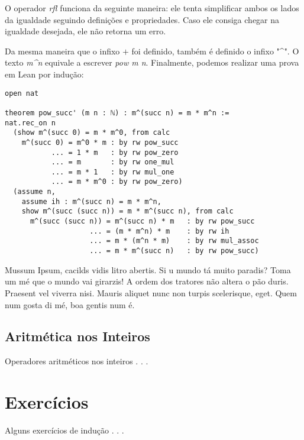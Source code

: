 O operador \textit{rfl} funciona da seguinte maneira: ele tenta simplificar ambos os lados da igualdade seguindo definições e propriedades. Caso ele consiga chegar na igualdade desejada, ele não retorna um erro.

Da mesma maneira que o infixo $+$ foi definido, também é definido o infixo "\textasciicircum ". O texto \textit{m\textasciicircum n} equivale a escrever \textit{pow m n}. Finalmente, podemos realizar uma prova em Lean por indução:

\begin{lstlisting}
open nat

theorem pow_succ' (m n : ℕ) : m^(succ n) = m * m^n :=
nat.rec_on n
  (show m^(succ 0) = m * m^0, from calc
    m^(succ 0) = m^0 * m : by rw pow_succ
           ... = 1 * m   : by rw pow_zero
           ... = m       : by rw one_mul
           ... = m * 1   : by rw mul_one
           ... = m * m^0 : by rw pow_zero)
  (assume n,
    assume ih : m^(succ n) = m * m^n,
    show m^(succ (succ n)) = m * m^(succ n), from calc
      m^(succ (succ n)) = m^(succ n) * m   : by rw pow_succ
                    ... = (m * m^n) * m    : by rw ih
                    ... = m * (m^n * m)    : by rw mul_assoc
                    ... = m * m^(succ n)   : by rw pow_succ)
\end{lstlisting}

Mussum Ipsum, cacilds vidis litro abertis. Si u mundo tá muito paradis? Toma um mé que o mundo vai girarzis! A ordem dos tratores não altera o pão duris. Praesent vel viverra nisi. Mauris aliquet nunc non turpis scelerisque, eget. Quem num gosta di mé, boa gentis num é.

\subsection{Aritmética nos Inteiros}

Operadores aritméticos nos inteiros . . .

\section{Exercícios}

Alguns exercícios de indução . . .